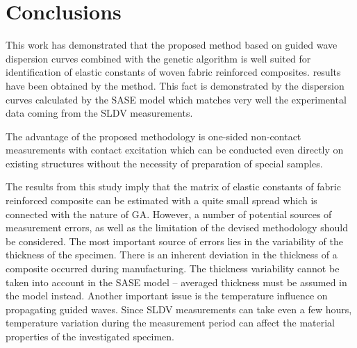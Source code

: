 \section{Conclusions}

This work has demonstrated that the proposed method based on guided wave dispersion curves combined with the genetic algorithm is well suited for identification of elastic constants of woven fabric reinforced composites. 
 results have been obtained by the   method. 
This fact is demonstrated by the dispersion curves calculated by the SASE model which matches very well the experimental data coming from the SLDV measurements. 
	
The advantage of the proposed methodology is one-sided non-contact measurements with contact excitation which can be conducted even directly on existing structures without the necessity of preparation of special samples.
	
The results from this study imply that the matrix of elastic constants of fabric reinforced composite can be estimated with a quite small spread which is connected with the nature of GA. 
However, a number of potential sources of measurement errors, as well as the limitation of the devised methodology should be considered. 
The most important source of errors lies in the variability of the thickness of the specimen. 
There is an inherent deviation in the thickness of a composite occurred during manufacturing. 
The thickness variability cannot be taken into account in the SASE model -- averaged thickness must be assumed in the model instead. 
Another important issue is the temperature influence on propagating guided waves.
Since SLDV measurements can take even a few hours, temperature variation during the measurement period can affect the material properties of the investigated specimen.  

